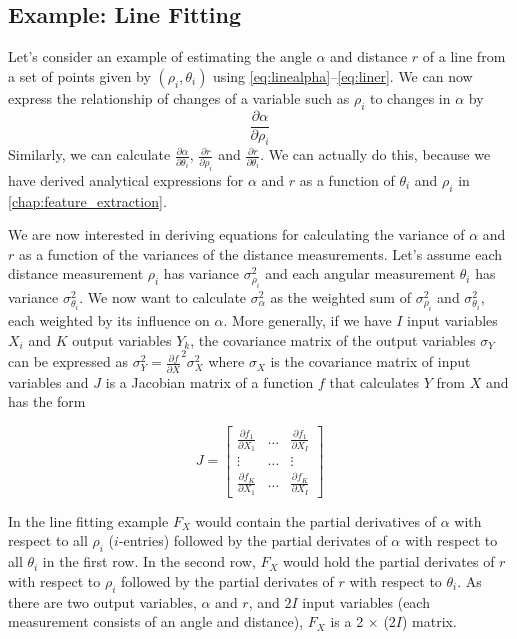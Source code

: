 \subsection{Example: Line Fitting}\label{sec:linefitting}
Let's consider an example of estimating the angle $\alpha$ and distance $r$ of a line from a set of points given by $(\rho_i,\theta_i)$ using \cref{eq:linealpha}--\ref{eq:liner}. We can now express the relationship of changes of a variable such as $ \rho_i$ to changes in $ \alpha$ by
\begin{equation}
\frac{\partial \alpha}{\partial \rho_i}
\end{equation}
Similarly, we can calculate $ \frac{\partial \alpha}{\partial \theta_i}$, $ \frac{\partial r}{\partial \rho_i}$ and $ \frac{\partial r}{\partial \theta_i}$. We can actually do this, because we have derived analytical expressions for $ \alpha$ and $ r$ as a function of $ \theta_i$ and $ \rho_i$ in \cref{chap:feature_extraction}.

We are now interested in deriving equations for calculating the variance of $ \alpha$ and $ r$ as a function of the variances of the distance measurements. Let's assume each distance measurement $ \rho_i$ has variance $ \sigma^2_{\rho_i}$ and each angular measurement $ \theta_i$ has variance $ \sigma^2_{\theta_i}$. We now want to calculate $ \sigma^2_{\alpha}$ as the weighted sum of  $ \sigma^2_{\rho_i}$ and $ \sigma^2_{\theta_i}$, each weighted by its influence on $ \alpha$.
More generally, if we have $ I$ input variables $ X_i$ and $K$ output variables $Y_k$, the covariance matrix of the output variables $ \sigma_Y$ can be expressed as $\sigma_Y^2=\frac{\partial f}{\partial X}^2 \sigma_X^2$ where $\sigma_X$ is the covariance matrix of input variables and $J$ is a Jacobian matrix of a function $ f$ that calculates $Y$ from $X$ and has the form

\begin{equation}
J=\left[
\begin{array}{ccc}
  \frac{\partial f_1}{\partial X_1} & \ldots & \frac{\partial f_1}{\partial X_I}\\
  \vdots & \ldots & \vdots\\
  \frac{\partial f_K}{\partial X_1} & \ldots & \frac{\partial f_K}{\partial X_I}
 \end{array}
 \right]
\end{equation}

In the line fitting example $ F_X$ would contain the partial derivatives of $ \alpha$ with respect to all $ \rho_i$ ($i$-entries) followed by the partial derivates of $ \alpha$ with respect to all $ \theta_i$ in the first row. In the second row, $ F_X$ would hold the partial derivates of $ r$ with respect to $ \rho_i$ followed by the partial derivates of $ r$ with respect to $ \theta_i$. As there are two output variables, $ \alpha$ and $ r$, and $2I$ input variables (each measurement consists of an angle and distance), $ F_X$ is a 2 $\times$ (2$I$) matrix.

